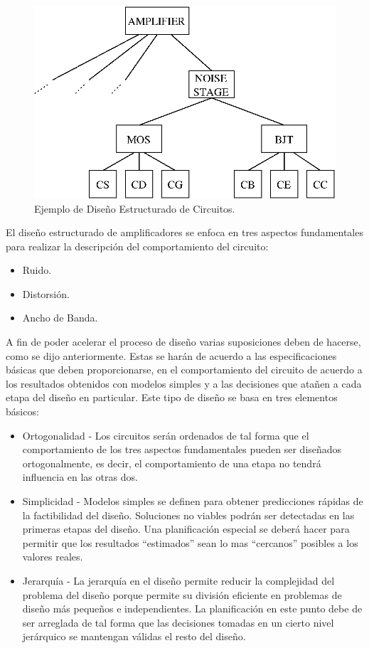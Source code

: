 \documentclass[10pt,twocolumn,twoside,letterpaper]{IEEEtran}
\begin{document}
{\begin{figure}[hbtp]
	\centering
	\includegraphics[scale=.65]{figures/bloque_ruido.eps}
	\caption{Ejemplo de Dise\~no Estructurado de Circuitos.}
	\label{fig:sd_1}
\end{figure}

El dise\~no estructurado de amplificadores se enfoca en tres aspectos fundamentales para realizar la descripci\'on del comportamiento del circuito:

\begin{itemize}
\item Ruido.
\item Distorsi\'on.
\item Ancho de Banda.
\end{itemize}

A fin de poder acelerar el proceso de dise\~no varias suposiciones deben de hacerse, como se dijo anteriormente. Estas se har\'an de acuerdo a las especificaciones b\'asicas que deben proporcionarse, en el comportamiento del circuito de acuerdo a los resultados obtenidos con modelos simples y a las decisiones que ata\~nen a cada etapa del dise\~no en particular. Este tipo de dise\~no se basa en tres elementos b\'asicos:

\begin{itemize}
\item Ortogonalidad - Los circuitos ser\'an ordenados de tal forma que el comportamiento de los tres aspectos fundamentales pueden ser dise\~nados ortogonalmente, es decir, el comportamiento de una etapa no tendr\'a influencia en las otras dos.
\item Simplicidad - Modelos simples se definen para obtener predicciones r\'apidas de la factibilidad del dise\~no. Soluciones no viables podr\'an ser detectadas en las primeras etapas del dise\~no. Una planificaci\'on especial se deber\'a hacer para permitir que los resultados ``estimados'' sean lo mas ``cercanos'' posibles a los valores reales.
\item Jerarqu\'ia - La jerarqu\'ia en el dise\~no permite reducir la complejidad del problema del dise\~no porque permite su divisi\'on eficiente en problemas de dise\~no m\'as peque\~nos e independientes. La planificaci\'on en este punto debe de ser a\-rre\-gla\-da de tal forma que las decisiones tomadas en un cierto nivel jer\'arquico se mantengan v\'alidas el resto del dise\~no.
\end{itemize}

}
\end{document}
